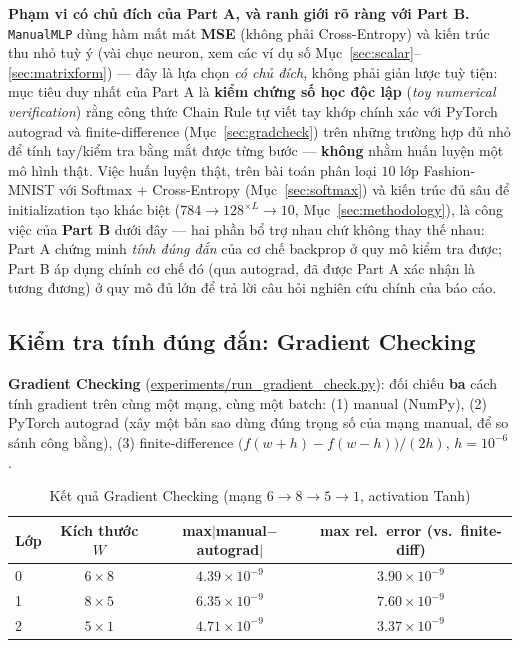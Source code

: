 \documentclass[12pt,a4paper]{report}
\newcommand{\en}[1]{\textit{#1}}
\begin{document}
\textbf{Phạm vi có chủ đích của Part A, và ranh giới rõ ràng với Part B.}
\texttt{ManualMLP} dùng hàm mất mát \textbf{MSE} (không phải
Cross-Entropy) và kiến trúc thu nhỏ tuỳ ý (vài chục neuron, xem các ví dụ
số Mục~\ref{sec:scalar}--\ref{sec:matrixform}) --- đây là lựa chọn
\emph{có chủ đích}, không phải giản lược tuỳ tiện: mục tiêu duy nhất của
Part A là \textbf{kiểm chứng số học độc lập} (\en{toy numerical
verification}) rằng công thức Chain Rule tự viết tay khớp chính xác với
PyTorch autograd và finite-difference (Mục~\ref{sec:gradcheck}) trên
những trường hợp đủ nhỏ để tính tay/kiểm tra bằng mắt được từng bước ---
\textbf{không} nhằm huấn luyện một mô hình thật. Việc huấn luyện thật,
trên bài toán phân loại $10$ lớp Fashion-MNIST với Softmax + Cross-Entropy
(Mục~\ref{sec:softmax}) và kiến trúc đủ sâu để initialization tạo khác
biệt ($784\to128^{\times L}\to10$, Mục~\ref{sec:methodology}), là công
việc của \textbf{Part B} dưới đây --- hai phần bổ trợ nhau chứ không thay
thế nhau: Part A chứng minh \emph{tính đúng đắn} của cơ chế backprop ở
quy mô kiểm tra được; Part B áp dụng chính cơ chế đó (qua autograd, đã
được Part A xác nhận là tương đương) ở quy mô đủ lớn để trả lời câu hỏi
nghiên cứu chính của báo cáo.

\subsection{Kiểm tra tính đúng đắn: Gradient Checking}

\textbf{Gradient Checking} (\url{experiments/run_gradient_check.py}):
đối chiếu \textbf{ba} cách tính gradient trên cùng một mạng, cùng một
batch: (1) manual (NumPy), (2) PyTorch autograd (xây một bản sao dùng đúng
trọng số của mạng manual, để so sánh công bằng), (3) finite-difference
$\big(f(w+h)-f(w-h)\big)/(2h)$, $h=10^{-6}$.

\begin{table}[htbp]
\centering
\caption{Kết quả Gradient Checking (mạng $6\to8\to5\to1$, activation Tanh)}
\begin{tabular}{@{}lccc@{}}
\toprule
Lớp & Kích thước $W$ & max$|$manual$-$autograd$|$ & max rel.\ error (vs.\ finite-diff) \\
\midrule
0 & $6\times8$ & $4.39\times10^{-9}$ & $3.90\times10^{-9}$ \\
1 & $8\times5$ & $6.35\times10^{-9}$ & $7.60\times10^{-9}$ \\
2 & $5\times1$ & $4.71\times10^{-9}$ & $3.37\times10^{-9}$ \\
\bottomrule
\end{tabular}
\label{tab:gradcheck}
\end{table}
\label{sec:gradcheck}
\end{document}
